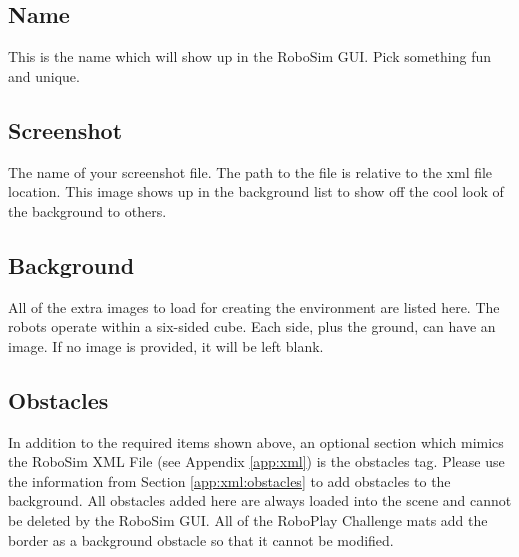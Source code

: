 \documentclass{article}
\begin{document}
\subsection{Name}
This is the name which will show up in the RoboSim GUI.  Pick something fun and
unique.

\subsection{Screenshot}
The name of your screenshot file.  The path to the file is relative to the xml
file location.  This image shows up in the background list to show off the cool
look of the background to others.

\subsection{Background}
All of the extra images to load for creating the environment are listed here.
The robots operate within a six-sided cube.  Each side, plus the ground, can
have an image.  If no image is provided, it will be left blank.

\subsection{Obstacles}
In addition to the required items shown above, an optional section which mimics
the RoboSim XML File (see Appendix \ref{app:xml}) is the obstacles tag.  Please
use the information from Section \ref{app:xml:obstacles} to add obstacles to the
background.  All obstacles added here are always loaded into the scene and
cannot be deleted by the RoboSim GUI.  All of the RoboPlay Challenge mats add
the border as a background obstacle so that it cannot be modified.
\end{document}
